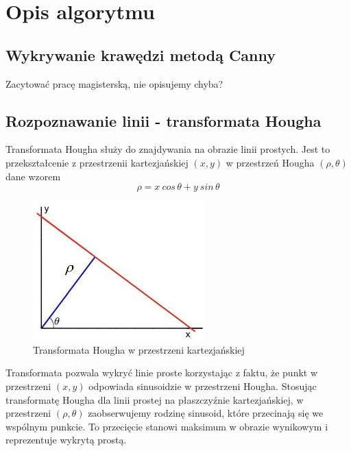 \section{Opis algorytmu}



\subsection{Wykrywanie krawędzi metodą Canny}

Zacytować pracę magisterską, nie opisujemy chyba?

\subsection{Rozpoznawanie linii - transformata Hougha}

Transformata Hougha służy do znajdywania na obrazie linii prostych. Jest to przekształcenie z przestrzenii kartezjańskiej $(x,y)$ w przestrzeń Hougha $(\rho, \theta)$ dane wzorem
\begin{equation}
\rho = x\: cos\, \theta + y\: sin\, \theta
\end{equation}

\begin{figure}[!htb]
  \begin{center}
    \includegraphics[scale=1]{img/hough-line.jpg}
    \caption{Transformata Hougha w przestrzeni kartezjańskiej}
  \end{center}
  
  \label{rys:maglev}
\end{figure}

Transformata pozwala wykryć linie proste korzystając z faktu, że punkt w przestrzeni $(x,y)$ odpowiada sinusoidzie w przestrzeni Hougha. Stosując transformatę Hougha dla linii prostej na płaszczyźnie kartezjańskiej, w przestrzeni $(\rho, \theta)$ zaobserwujemy rodzinę sinusoid, które przecinają się we wspólnym punkcie. To przecięcie stanowi maksimum w obrazie wynikowym i reprezentuje wykrytą prostą.



